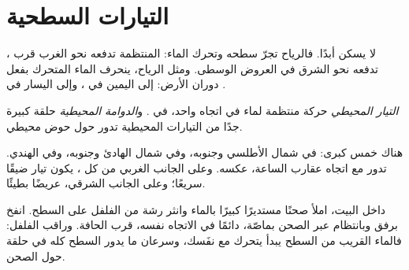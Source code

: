 \section{التيارات السطحية}

 لا يسكن أبدًا. فالرياح تجرّ سطحه وتحرك الماء: 
المنتظمة تدفعه نحو الغرب قرب ،  تدفعه نحو الشرق
في العروض الوسطى. ومثل الرياح، ينحرف الماء المتحرك بفعل دوران الأرض: إلى
اليمين في ، وإلى اليسار في .

\begin{definition}\label{def:g8:the-oceans:current}
\emph{التيار المحيطي} حركة منتظمة لماء  في اتجاه
واحد،  في . و\emph{الدوامة المحيطية} حلقة
كبيرة جدًا من التيارات المحيطية تدور حول حوض
محيطي.
\end{definition}
\label{def:g8:the-oceans:gyre}

هناك خمس  كبرى: في شمال الأطلسي وجنوبه، وفي شمال الهادئ
وجنوبه، وفي  الهندي.   تدور مع اتجاه عقارب
الساعة،   عكسه. وعلى الجانب الغربي من كل ،
يكون تيار  ضيقًا سريعًا؛ وعلى الجانب الشرقي، عريضًا
بطيئًا.

\begin{inthelab}
داخل البيت، املأ صحنًا مستديرًا كبيرًا بالماء وانثر رشة من الفلفل على
السطح. انفخ برفق وبانتظام عبر الصحن بماصّة، دائمًا في الاتجاه نفسه، قرب
الحافة. وراقب الفلفل: فالماء القريب من السطح يبدأ يتحرك مع نفَسك، وسرعان
ما يدور السطح كله في حلقة حول الصحن.
\end{inthelab}

